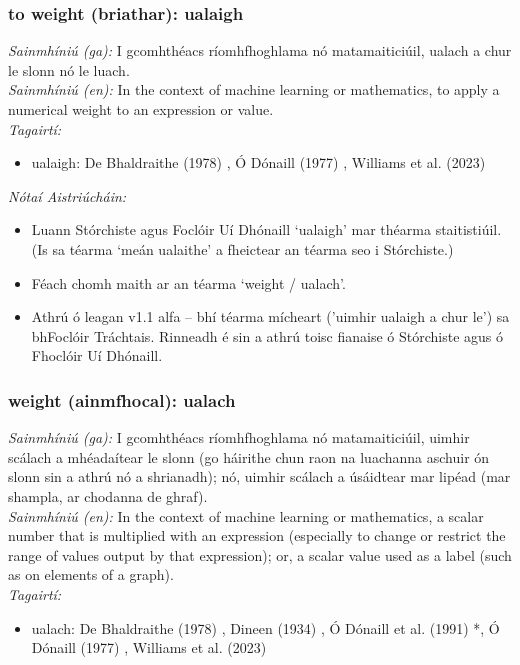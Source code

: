 \subsubsection*{to weight (briathar): ualaigh}
 \noindent \textit{Sainmhíniú (ga):} I gcomhthéacs ríomhfhoghlama nó matamaiticiúil, ualach a chur le slonn nó le luach.
\\
 \noindent \textit{Sainmhíniú (en):} In the context of machine learning or mathematics, to apply a numerical weight to an expression or value.
\\
 \noindent \textit{Tagairtí:}
\begin{itemize}
	\item ualaigh: De Bhaldraithe (1978) \cite{de-bhaldraithe}, Ó Dónaill (1977) \cite{odonaill}, Williams et al. (2023) \cite{storchiste}
\end{itemize}

 \noindent \textit{Nótaí Aistriúcháin:}
\begin{itemize}
	\item Luann Stórchiste agus Foclóir Uí Dhónaill `ualaigh' mar théarma staitistiúil. (Is sa téarma `meán ualaithe' a fheictear an téarma seo i Stórchiste.)
	\item Féach chomh maith ar an téarma `weight / ualach'.
	\item Athrú ó leagan v1.1 alfa -- bhí téarma mícheart ('uimhir ualaigh a chur le') sa bhFoclóir Tráchtais. Rinneadh é sin a athrú toisc fianaise ó Stórchiste agus ó Fhoclóir Uí Dhónaill.
\end{itemize}


\subsubsection*{weight (ainmfhocal): ualach}
 \noindent \textit{Sainmhíniú (ga):} I gcomhthéacs ríomhfhoghlama nó matamaiticiúil, uimhir scálach a mhéadaítear le slonn (go háirithe chun raon na luachanna aschuir ón slonn sin a athrú nó a shrianadh); nó, uimhir scálach a úsáidtear mar lipéad (mar shampla, ar chodanna de ghraf).
\\
 \noindent \textit{Sainmhíniú (en):} In the context of machine learning or mathematics, a scalar number that is multiplied with an expression (especially to change or restrict the range of values output by that expression); or, a scalar value used as a label (such as on elements of a graph).
\\
 \noindent \textit{Tagairtí:}
\begin{itemize}
	\item ualach: De Bhaldraithe (1978) \cite{de-bhaldraithe}, Dineen (1934) \cite{dineen}, Ó Dónaill et al. (1991) \cite{focloir-beag}*, Ó Dónaill (1977) \cite{odonaill}, Williams et al. (2023) \cite{storchiste}
\end{itemize}

